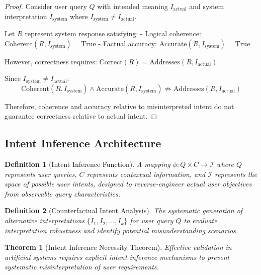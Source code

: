 \documentclass[12pt,a4paper]{article}
\newtheorem{theorem}{Theorem}
\newtheorem{definition}{Definition}
\begin{document}
\begin{proof}
Consider user query $Q$ with intended meaning $I_{\text{actual}}$ and system interpretation $I_{\text{system}}$ where $I_{\text{system}} \neq I_{\text{actual}}$.

Let $R$ represent system response satisfying:
- Logical coherence: $\text{Coherent}(R, I_{\text{system}}) = \text{True}$
- Factual accuracy: $\text{Accurate}(R, I_{\text{system}}) = \text{True}$

However, correctness requires: $\text{Correct}(R) = \text{Addresses}(R, I_{\text{actual}})$

Since $I_{\text{system}} \neq I_{\text{actual}}$:
$$\text{Coherent}(R, I_{\text{system}}) \land \text{Accurate}(R, I_{\text{system}}) \not\Rightarrow \text{Addresses}(R, I_{\text{actual}})$$

Therefore, coherence and accuracy relative to misinterpreted intent do not guarantee correctness relative to actual intent.
\end{proof}

\subsection{Intent Inference Architecture}

\begin{definition}[Intent Inference Function]
A mapping $\phi: Q \times C \to \mathcal{I}$ where $Q$ represents user queries, $C$ represents contextual information, and $\mathcal{I}$ represents the space of possible user intents, designed to reverse-engineer actual user objectives from observable query characteristics.
\end{definition}

\begin{definition}[Counterfactual Intent Analysis]
The systematic generation of alternative interpretations $\{I_1, I_2, ..., I_k\}$ for user query $Q$ to evaluate interpretation robustness and identify potential misunderstanding scenarios.
\end{definition}

\begin{theorem}[Intent Inference Necessity Theorem]
Effective validation in artificial systems requires explicit intent inference mechanisms to prevent systematic misinterpretation of user requirements.
\end{theorem}
\end{document}
